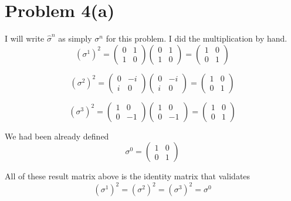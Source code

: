 \documentclass[letter]{article}
\begin{document}
\section*{Problem 4(a)}
I will write $\hat{\sigma}^{n}$ as simply $\sigma^{n}$ for this problem. I did the multiplication by hand. 
\[
	(\sigma^{1})^2 = 
	\begin{pmatrix} 0 & 1 \\ 1 & 0 \end{pmatrix} 
	\begin{pmatrix} 0 & 1 \\ 1 & 0 \end{pmatrix}  = 
	\begin{pmatrix} 1 & 0 \\ 0 & 1 \end{pmatrix} 
\] 

\[
	(\sigma^{2})^2 = 
	\begin{pmatrix} 0 & -i \\ i & 0 \end{pmatrix} 
	\begin{pmatrix} 0 & -i \\ i & 0 \end{pmatrix}  = 
	\begin{pmatrix} 1 & 0 \\ 0 & 1 \end{pmatrix} 
\]

\[
	(\sigma^{3})^2 =
	\begin{pmatrix} 1 & 0 \\ 0 & -1 \end{pmatrix} 
	\begin{pmatrix} 1 & 0 \\ 0 & -1 \end{pmatrix}  = 
	\begin{pmatrix} 1 & 0 \\ 0 & 1 \end{pmatrix} 
\]

We had been already defined 
\[
\sigma^{0} = 
	\begin{pmatrix} 1 & 0 \\ 0 & 1 \end{pmatrix} 
\] 

All of these result matrix above is the identity matrix that validates 
\[
	(\sigma ^{1})^2 = (\sigma ^{2})^2 = (\sigma ^{3})^2 = \sigma^0
\]
\end{document}
